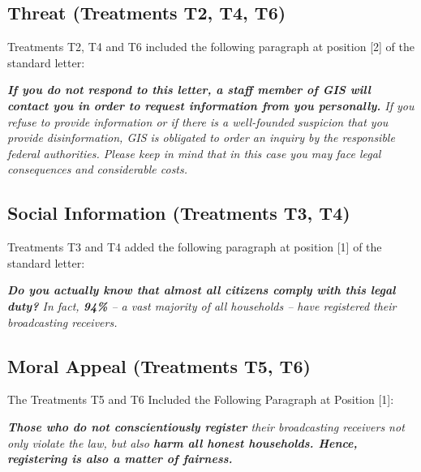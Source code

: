 \documentclass[prod,jeeabib]{jeea}
\begin{document}
\subsection{Threat (Treatments T2, T4, T6)}
\small{\noindent Treatments T2, T4 and T6 included the following paragraph at position [2] of the standard letter:}


\footnotesize{\noindent \textsl{\textbf{If you do not
respond to this letter, a staff member of GIS will contact you in
order to request information from you personally.} If you refuse
to provide information or if there is a well-founded suspicion that you provide disinformation, GIS is obligated to order an inquiry by the
responsible federal authorities. Please keep in mind that in this
case you may face legal consequences and considerable costs.}}

\subsection{Social Information (Treatments T3, T4)}

\small{\noindent Treatments T3 and T4 added the following paragraph at position [1] of the standard letter:}

\footnotesize{\noindent \textsl{\textbf{Do you actually know
that almost all citizens comply with this legal duty?} In fact, \textbf{94\%} -- a vast majority of all households -- have registered
their broadcasting receivers.}}

\subsection{Moral Appeal (Treatments T5, T6)}

\small{\noindent The Treatments T5 and T6 Included the Following Paragraph at Position [1]:}

\footnotesize{\noindent \textsl{\textbf{Those who do not
conscientiously register} their broadcasting receivers not only violate
the law, but also \textbf{harm all honest households. Hence,
registering is also a matter of fairness.}}}

\end{document}
